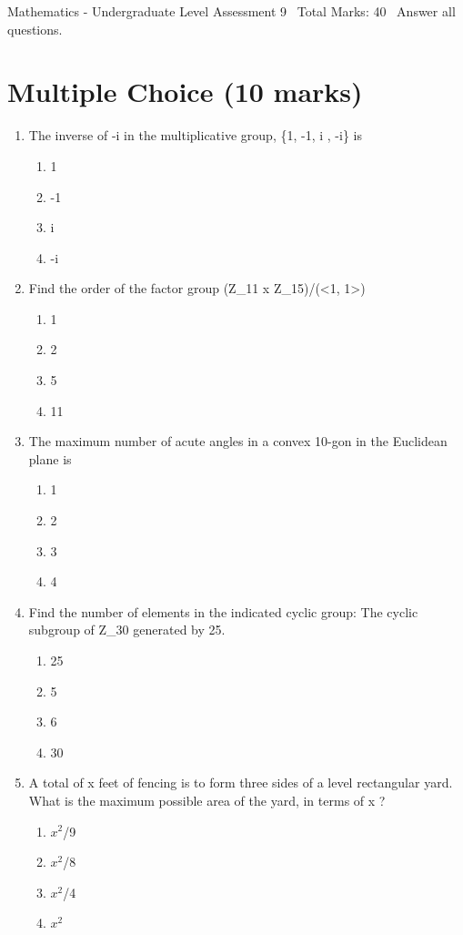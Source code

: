 \documentclass[12pt]{article}
\begin{document}
\begin{center}
Mathematics - Undergraduate Level Assessment 9 \
Total Marks: 40 \
Answer all questions.
\end{center}

\section*{Multiple Choice (10 marks)}
\begin{enumerate}[label=\arabic*.]
\item The inverse of -i in the multiplicative group, \{1, -1, i , -i\} is
\begin{enumerate}[label=(\alph*)]
    \item 1
    \item -1
    \item i
    \item -i
\end{enumerate}
\item Find the order of the factor group (Z\_11 x Z\_15)/(\textless{}1, 1\textgreater{})
\begin{enumerate}[label=(\alph*)]
    \item 1
    \item 2
    \item 5
    \item 11
\end{enumerate}
\item The maximum number of acute angles in a convex 10-gon in the Euclidean plane is
\begin{enumerate}[label=(\alph*)]
    \item 1
    \item 2
    \item 3
    \item 4
\end{enumerate}
\item Find the number of elements in the indicated cyclic group: The cyclic subgroup of Z\_30 generated by 25.
\begin{enumerate}[label=(\alph*)]
    \item 25
    \item 5
    \item 6
    \item 30
\end{enumerate}
\item A total of x feet of fencing is to form three sides of a level rectangular yard. What is the maximum possible area of the yard, in terms of x ?
\begin{enumerate}[label=(\alph*)]
    \item $x^2$/9
    \item $x^2$/8
    \item $x^2$/4
    \item $x^2$
\end{enumerate}
\end{enumerate}
\end{document}
